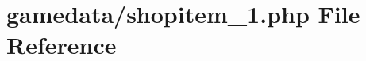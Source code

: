 \hypertarget{shopitem__1_8php}{\section{gamedata/shopitem\+\_\+1.php File Reference}
\label{shopitem__1_8php}
}
